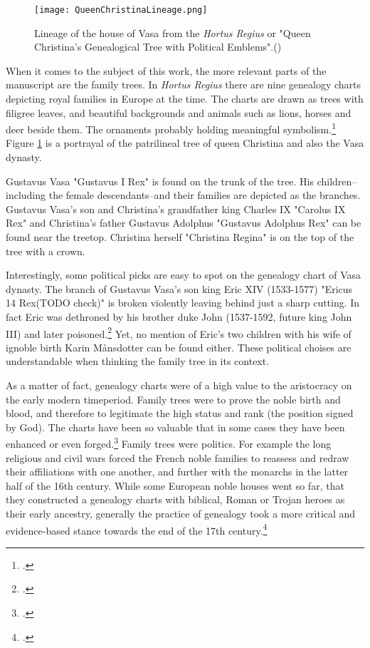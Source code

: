 \begin{figure}
	\texttt{[image: QueenChristinaLineage.png]}
	\caption[Lineage of the house of Vasa from the \textit{Hortus Regius}]{Lineage of the house of Vasa from the \textit{Hortus Regius} or "Queen Christina's Genealogical Tree with Political Emblems".(\cite{hortusregius})} 
	\centering
	\label{queenlineage}
\end{figure}

When it comes to the subject of this work, the more relevant parts of the manuscript are the family trees. In \textit{Hortus Regius} there are nine genealogy charts depicting royal families in Europe at the time. The charts are drawn as trees with filigree leaves, and beautiful backgrounds and animals such as lions, horses and deer beside them. The ornaments probably holding meaningful symbolism.\footcite{hortusregius} Figure \ref{queenlineage} is a portrayal of the patrilineal tree of queen Christina and also the Vasa dynasty.

Gustavus Vasa "Gustavus I Rex" is found on the trunk of the tree. His children–including the female descendants–and their families are depicted as the branches. Gustavus Vasa's son and Christina's grandfather king Charles IX "Carolus IX Rex" and Christina's father Gustavus Adolphus "Gustavus Adolphus Rex" can be found near the treetop. Christina herself "Christina Regina" is on the top of the tree with a crown. 

Interestingly, some political picks are easy to spot on the genealogy chart of Vasa dynasty. The branch of Gustavus Vasa's son king Eric XIV (1533-1577) "Ericus 14 Rex(TODO check)" is broken violently leaving behind just a sharp cutting. In fact Eric was dethroned by his brother duke John (1537-1592, future king John III) and later poisoned.\footcite[pp. 118-124.]{MelinEtAl} Yet, no mention of Eric's two children with his wife of ignoble birth Karin Månsdotter can be found either. These political choises are understandable when thinking the family tree in its context. 

As a matter of fact, genealogy charts were of a high value to the aristocracy on the early modern timeperiod. Family trees were to prove the noble birth and blood, and therefore to legitimate the high status and rank (the position signed by God). The charts have been so valuable that in some cases they have been enhanced or even forged.\footcites[pp. 192-197]{friedrich18}[p. 150]{hakanenEtAll2020}[p. 158.]{lappalainen06} Family trees were politics. For example the long religious and civil wars forced the French noble families to reassess and redraw their affiliations with one another, and further with the monarchs in the latter half of the 16th century. While some European noble houses went so far, that they constructed a genealogy charts with biblical, Roman or Trojan heroes as their early ancestry, generally the practice of genealogy took a more critical and evidence-based stance towards the end of the 17th century.\footcite[pp. 192-197.]{friedrich18}

